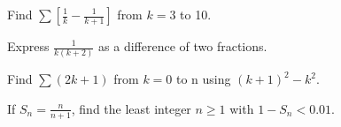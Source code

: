 \documentclass[11pt]{article}
\begin{document}
Find \(\sum [\frac{1}{k}-\frac{1}{k+1}]\) from \(k=3\) to 10.\par
\vspace{5pt}
Express \(\frac{1}{k(k+2)}\) as a difference of two fractions.\par
\vspace{5pt}
Find \(\sum (2k+1)\) from \(k=0\) to n using \((k+1)^{2}-k^{2}\).\par
\vspace{5pt}
If \(S_{n}=\frac{n}{n+1}\), find the least integer \(n\geq 1\) with \(1-S_{n}<0.01\).\par
\vspace{5pt}
\end{document}
